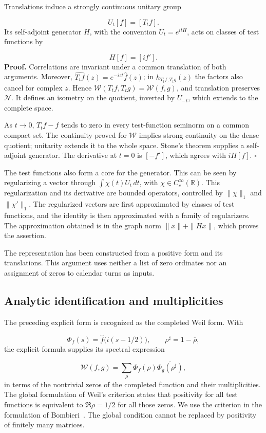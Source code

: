Translations induce a strongly continuous unitary group

\[
U_t[f]=[T_tf].
\]
Its self-adjoint generator \(H\), with the convention \(U_t=e^{itH}\), acts on classes of test functions by

\[
H[f]=[i f'].
\]
\textbf{Proof.} Correlations are invariant under a common translation of both arguments. Moreover, \(\widehat{T_tf}(z)=e^{-izt}\widehat f(z)\); in \(h_{T_tf,T_tg}(z)\) the factors also cancel for complex \(z\). Hence \(\mathscr W(T_tf,T_tg)=\mathscr W(f,g)\), and translation preserves \(\mathcal N\). It defines an isometry on the quotient, inverted by \(U_{-t}\), which extends to the complete space.

As \(t\to0\), \(T_tf-f\) tends to zero in every test-function seminorm on a common compact set. The continuity proved for \(\mathscr W\) implies strong continuity on the dense quotient; unitarity extends it to the whole space. Stone's theorem supplies a self-adjoint generator. The derivative at \(t=0\) is \([-f']\), which agrees with \(iH[f]\). \hfill\(\square\)

The test functions also form a core for the generator. This can be seen by regularizing a vector through \(\int\chi(t)U_t\,dt\), with \(\chi\in C_c^\infty(\mathbb R)\). This regularization and its derivative are bounded operators, controlled by \(\|\chi\|_1\) and \(\|\chi'\|_1\). The regularized vectors are first approximated by classes of test functions, and the identity is then approximated with a family of regularizers. The approximation obtained is in the graph norm \(\|x\|+\|Hx\|\), which proves the assertion.

The representation has been constructed from a positive form and its translations. This argument uses neither a list of zero ordinates nor an assignment of zeros to calendar turns as inputs.

\subsection{Analytic identification and multiplicities}
\label{viii:rz:identificacion}
The preceding explicit form is recognized as the completed Weil form. With

\[
\Phi_f(s)=\widehat f\bigl(i(s-1/2)\bigr),
\qquad \rho^\sharp=1-\overline\rho,
\]
the explicit formula supplies its spectral expression

\[
\mathscr W(f,g)=\sum_\rho
\Phi_f(\rho)\overline{\Phi_g(\rho^\sharp)},
\]
in terms of the nontrivial zeros of the completed function and their multiplicities.
The global formulation of Weil's criterion states that positivity for
all test functions is equivalent to \(\Re\rho=1/2\) for all
those zeros. We use the criterion in the formulation of
Bombieri~\cite{viii:bombieri2000}. The global condition cannot be replaced
by positivity of finitely many matrices.

